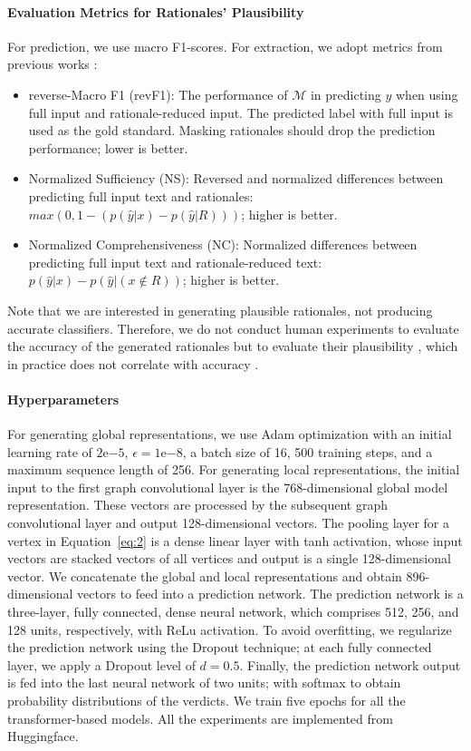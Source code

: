 \documentclass[letterpaper]{article} %
\newcommand{\be}{\begin{itemize}}
\newcommand{\ee}{\end{itemize}}
\begin{document}
\paragraph{Evaluation Metrics for Rationales' Plausibility}
\label{sec:metric}
For prediction, we use macro F1-scores.
For extraction, we adopt metrics from previous works \cite{jain-2020-learning, chrysostomou-2022-flexible}:
\be{}
    \item reverse-Macro F1 (revF1): The performance of $\mathcal{M}$ in predicting $y$ when using full input and rationale-reduced input. The predicted label with full input is used as the gold standard. Masking rationales should drop the prediction performance; lower is better.
    \item Normalized Sufficiency (NS): 
    Reversed and normalized differences between predicting full input text and rationales: $max(0, 1-(p(\hat{y}|x)-p(\hat{y}|R)))$; higher is better. 
    \item Normalized Comprehensiveness (NC): Normalized differences between predicting full input text and rationale-reduced text: $p(\hat{y}|x)-p(\hat{y}|(x\not\in R))$; higher is better. 
\ee{}
Note that we are interested in generating plausible rationales, not producing accurate classifiers.
Therefore, we do not conduct human experiments to evaluate the accuracy of the generated rationales but to evaluate their plausibility \cite{chrysostomou-2022-flexible}, which in practice does not correlate with accuracy \cite{atanasova-2020-diagnostic}.

\paragraph{Hyperparameters}

For generating global representations, we use Adam optimization with an initial learning rate of $2\mathrm{e}{-5}$, $\epsilon=1\mathrm{e}{-8}$, a batch size of 16, \num{500} training steps, and a maximum sequence length of \num{256}.  
For generating local representations, the initial input to the first graph convolutional layer is the 768-dimensional global model representation.
These vectors are processed by the subsequent graph convolutional layer and output \num{128}-dimensional vectors.
The pooling layer for a vertex in Equation~\ref{eq:2} is a dense linear layer with tanh activation, whose input vectors are stacked vectors of all vertices and output is a single \num{128}-dimensional vector. 
We concatenate the global and local representations and obtain 896-dimensional vectors to feed into a prediction network.
The prediction network is a three-layer, fully connected, dense neural network, which comprises \num{512}, \num{256}, and \num{128} units, respectively, with ReLu activation.
To avoid overfitting, we regularize the prediction network using the Dropout technique; at each fully connected layer, we apply a Dropout level of $d = 0.5$.
Finally, the prediction network output is fed into the last neural network of two units; with softmax to obtain probability distributions of the verdicts.
We train five epochs for all the transformer-based models. 
All the experiments are implemented from Huggingface.
\end{document}
